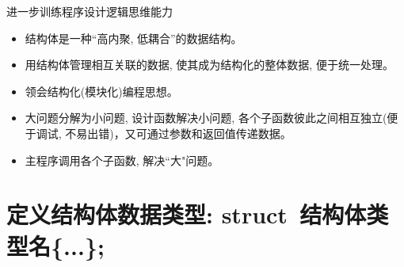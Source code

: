 
\begin{frame}{进一步训练程序设计逻辑思维能力}
\begin{itemize}
	\setlength{\itemsep}{.5cm}
	\item 结构体是一种``高内聚, 低耦合''的数据结构。 
	\item 用结构体管理相互关联的数据, 使其成为结构化的整体数据, 便于统一处理。 
	\item 领会结构化(模块化)编程思想。
	\item 大问题分解为小问题, 设计函数解决小问题, 各个子函数彼此之间相互独立(便于调试, 不易出错)，又可通过参数和返回值传递数据。
	\item 主程序调用各个子函数, 解决``大"问题。
\end{itemize}
\end{frame}


\section{定义结构体数据类型:  struct\, 结构体类型名\{...\};}

